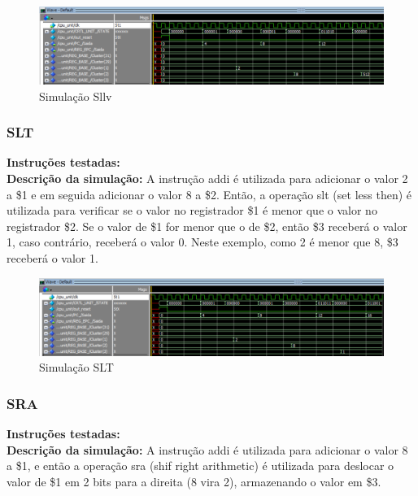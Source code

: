 \begin{figure}[htbp!]
\centering
\includegraphics[width=1\textwidth]{figure/simulacao_sllv.png}
\caption{Simulação Sllv} 
\label{fig:imagem_massa}
\end{figure}

\newpage

\subsubsection{SLT}
\textbf{Instruções testadas:}
 \\

\textbf{Descrição da simulação:} A instrução addi é utilizada para adicionar o valor 2 a \$1 e em seguida adicionar o valor 8 a \$2. Então, a operação slt (set less then) é utilizada para verificar se o valor no registrador \$1 é menor que o valor no registrador \$2. Se o valor de \$1 for menor que o de \$2, então \$3 receberá o valor 1, caso contrário, receberá o valor 0. Neste exemplo, como 2 é menor que 8, \$3 receberá o valor 1.  \\

\begin{figure}[htbp!]
\centering
\includegraphics[width=1\textwidth]{figure/simulacao_slt.png}
\caption{Simulação SLT} 
\label{fig:imagem_massa}
\end{figure}

\subsubsection{SRA}
\textbf{Instruções testadas:}
 \\

\textbf{Descrição da simulação:} A instrução addi é utilizada para adicionar o valor 8 a \$1, e então a operação sra (shif right arithmetic) é utilizada para deslocar o valor de \$1 em 2 bits para a direita (8 vira 2), armazenando o valor em \$3.  \\

